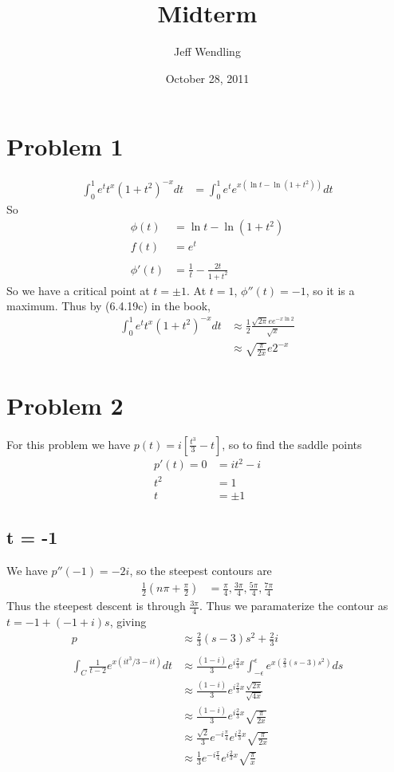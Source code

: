\documentclass[12pt]{article}
\title{Midterm}
\author{Jeff Wendling}
\date{October 28, 2011}
\newcommand{\eq}[1]{\begin{align*}#1\end{align*}}
\begin{document}
\maketitle
\section*{Problem 1}
\eq{
	\int_0^1e^t t^x(1+t^2)^{-x} dt &= \int_0^1 e^t e^{x(\ln t - \ln(1 + t^2))} dt
}
So
\eq{
	\phi(t) &= \ln t - \ln(1+t^2)\\
	f(t) &= e^t\\
	\\
	\phi'(t) &= \frac{1}{t} - \frac{2t}{1+t^2}
}
So we have a critical point at $t = \pm1$. At $t = 1$, $\phi''(t) = -1$, so it is a maximum. Thus by (6.4.19c) in the book,
\eq{
	\int_0^1e^t t^x(1+t^2)^{-x} dt &\approx \frac{1}{2} \frac{\sqrt{2\pi} e e^{-x \ln 2}}{\sqrt{x}}\\
	&\approx \sqrt{\frac{\pi}{2x}}e 2^{-x}
}
\section*{Problem 2}
For this problem we have $p(t) = i\left[\frac{t^3}{3} - t\right]$, so to find the saddle points
\eq{
	p'(t) = 0 &= it^2 - i\\
	t^2 &= 1\\
	t &= \pm 1
}
\subsection*{t = -1}
We have $p''(-1) = -2i$, so the steepest contours are
\eq{
	\frac{1}{2}(n\pi + \frac{\pi}{2}) &= \frac{\pi}{4}, \frac{3\pi}{4}, \frac{5\pi}{4}, \frac{7\pi}{4}
}
Thus the steepest descent is through $\frac{3\pi}{4}$. Thus we paramaterize the contour as $t = -1 + (-1 + i)s$, giving
\eq{
	p &\approx \frac{2}{3}(s-3)s^2 + \frac{2}{3}i\\
	\\
	\int_C \frac{1}{t-2} e^{x(it^3/3 - it)} dt &\approx \frac{(1 - i)}{3}e^{i\frac{2}{3}x} \int_{-\epsilon}^\epsilon e^{x(\frac{2}{3}(s-3)s^2)} ds\\
	&\approx \frac{(1 - i)}{3}e^{i\frac{2}{3}x} \frac{\sqrt{2\pi}}{\sqrt{4x}}\\
	&\approx \frac{(1 - i)}{3}e^{i\frac{2}{3}x} \sqrt{\frac{\pi}{2x}}\\
	&\approx \frac{\sqrt{2}}{3}e^{-i\frac{\pi}{4}} e^{i\frac{2}{3}x} \sqrt{\frac{\pi}{2x}}\\
	&\approx \frac{1}{3}e^{-i\frac{\pi}{4}} e^{i\frac{2}{3}x} \sqrt{\frac{\pi}{x}}
}
\end{document}
